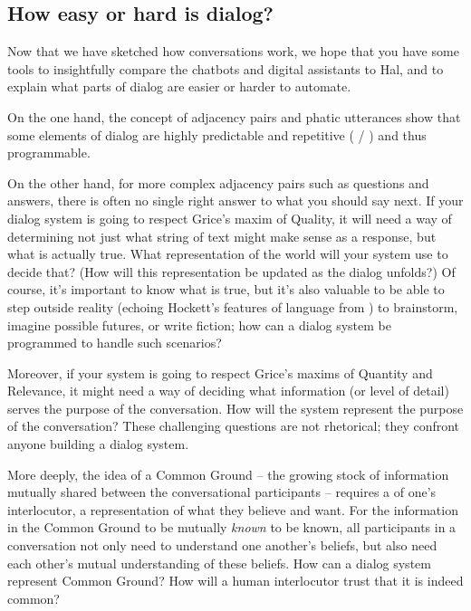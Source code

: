 





\subsection{How easy or hard is dialog?}

Now that we have sketched how conversations work, we hope that you have some tools to insightfully compare the chatbots and digital assistants to Hal, and to explain what parts of dialog are easier or harder to automate.

On the one hand, the concept of adjacency pairs and phatic utterances show that some elements of dialog are highly predictable and repetitive ( / ) and thus programmable.

On the other hand, for more complex adjacency pairs such as questions and answers, there is often no single  right answer to what you should say next.  
If your dialog system is going to respect Grice's maxim of Quality, it will need a way of determining not just what string of text might make sense as a response, but what is actually true.   What representation of the world will your system use to decide that?  (How will this representation be updated as the dialog unfolds?)  Of course, it's important to know what is true, but it's also valuable to be able to step outside reality (echoing Hockett's features of language from ) to brainstorm, imagine possible futures, or write fiction; how can a dialog system be programmed to handle such scenarios?

Moreover, if your system is going to respect Grice's maxims of Quantity and Relevance, it might need a way of deciding what information (or level of detail) serves the purpose of the conversation.  How will the system represent the purpose of the conversation?  These challenging questions are not rhetorical; they confront anyone building a dialog system.


More deeply, the idea of a Common Ground -- the growing stock of information mutually shared between the conversational participants -- requires a  of one's interlocutor, a representation of what they believe and want.  For the information in the Common Ground to be mutually \emph{known} to be known, all participants in a conversation not only need to understand one another's beliefs, but also need each other's mutual understanding of these beliefs.  How can a dialog system represent Common Ground?  How will a human interlocutor trust that it is indeed common?

